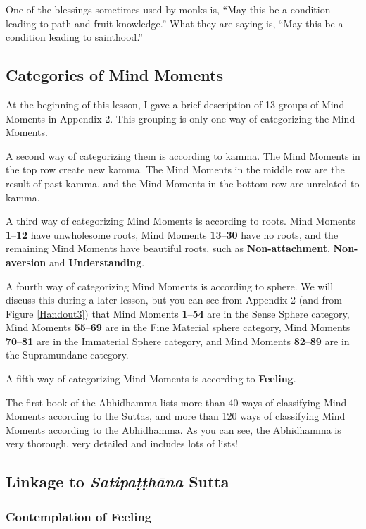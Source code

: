 One of the blessings sometimes used by monks is, “May this be a condition leading to path and fruit knowledge.” What they are saying is, “May this be a condition leading to sainthood.”

\pagebreak

\subsection*{Categories of Mind Moments}

At the beginning of this lesson, I gave a brief description of 13 groups of Mind Moments in Appendix 2. This grouping is only one way of categorizing the Mind Moments.

A second way of categorizing them is according to kamma. The Mind Moments in the top row create new kamma. The Mind Moments in the middle row are the result of past kamma, and the Mind Moments in the bottom row are unrelated to kamma.

A third way of categorizing Mind Moments is according to roots. Mind Moments \textbf{1}--\textbf{12} have unwholesome roots, Mind Moments \textbf{13}--\textbf{30} have no roots, and the remaining Mind Moments have beautiful roots, such as \textbf{Non-attachment}, \textbf{Non-aversion} and \textbf{Understanding}.

A fourth way of categorizing Mind Moments is according to sphere. We will discuss this during a later lesson, but you can see from Appendix 2 (and from Figure \ref{Handout3}) that Mind Moments \textbf{1}--\textbf{54} are in the Sense Sphere category, Mind Moments \textbf{55}--\textbf{69} are in the Fine Material sphere category, Mind Moments \textbf{70}--\textbf{81} are in the Immaterial Sphere category, and Mind Moments \textbf{82}--\textbf{89} are in the Supramundane category.

A fifth way of categorizing Mind Moments is according to \textbf{Feeling}.

The first book of the Abhidhamma lists more than 40 ways of classifying Mind Moments according to the Suttas, and more than 120 ways of classifying Mind Moments according to the Abhidhamma. As you can see, the Abhidhamma is very thorough, very detailed and includes lots of lists!

\subsection*{Linkage to \textit{Satipaṭṭhāna} Sutta}

\subsubsection*{Contemplation of \textbf{Feeling}}

